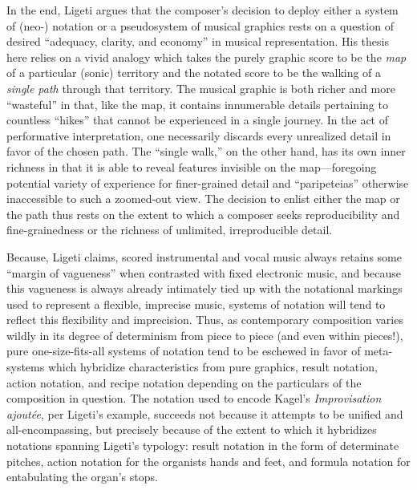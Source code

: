 In the end, Ligeti argues that the composer's decision to deploy either a system of (neo-) notation or a pseudosystem of musical graphics rests on a question of desired ``adequacy, clarity, and economy'' in musical representation. His thesis here relies on a vivid analogy which takes the purely graphic score to be the \textit{map} of a particular (sonic) territory and the notated score to be the walking of a \textit{single path} through that territory. The musical graphic is both richer and more ``wasteful'' in that, like the map, it contains innumerable details pertaining to countless ``hikes'' that cannot be experienced in a single journey. In the act of performative interpretation, one necessarily discards every unrealized detail in favor of the chosen path. The ``single walk,'' on the other hand, has its own inner richness in that it is able to reveal features invisible on the map---foregoing potential variety of experience for finer-grained detail and ``paripeteias'' otherwise inaccessible to such a zoomed-out view. The decision to enlist either the map or the path thus rests on the extent to which a composer seeks reproducibility and fine-grainedness or the richness of unlimited, irreproducible detail.\autocite[pg. 178 in Ernst et al., 1965.]{Ligeti_forthcoming}

Because, Ligeti  claims, scored instrumental and vocal music always retains some ``margin of vagueness'' when contrasted with fixed electronic music, and because this vagueness is always already intimately tied up with the notational markings used to represent a flexible, imprecise music, systems of notation will tend to reflect this flexibility and imprecision. Thus, as contemporary composition varies wildly in its degree of determinism from piece to piece (and even within pieces!), pure one-size-fits-all systems of notation tend to be eschewed in favor of meta-systems which hybridize characteristics from pure graphics, result notation, action notation, and recipe notation depending on the particulars of the composition in question. The notation used to encode Kagel's \textit{Improvisation ajoutée}, per Ligeti's example, succeeds not because it attempts to be unified and all-encompassing, but precisely because of the extent to which it hybridizes notations spanning Ligeti's typology: result notation in the form of determinate pitches, action notation for the organists hands and feet, and formula notation for entabulating the organ's stops.\autocite[pg. 180 in Ernst et al., 1965.]{Ligeti_forthcoming}


